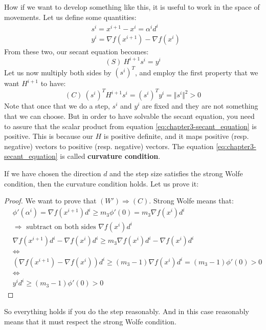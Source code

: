 How if we want to develop something like this, it is useful to work in the space of movements. Let us define some quantities:
\begin{align}
    &s^i = x^{i+1} - x^i = \alpha^i d^i\\
    &y^i = \nabla f(x^{i+1}) - \nabla f(x^i)
\end{align}
From these two, our secant equation becomes:
\begin{equation}
    (S)\ H^{i+1} s^i = y^i
\end{equation}
Let us now multiply both sides by $(s^i)^T$, and employ the first property that we want $H^{i+1}$ to have:
\begin{equation}
    (C)\ (s^i)^T H^{i+1} s^i = (s^i)^T y^i = \Vert s^i \Vert^2 > 0
    \label{eq:chapter3-secant_equation}
\end{equation}
Note that once that we do a step, $s^i$ and $y^i$ are fixed and they are not something that we can choose. But in order to have solvable the secant equation, you need to assure that the scalar product from equation \ref{eq:chapter3-secant_equation} is positive. This is because our $H$ is positive definite, and it maps positive (resp. negative) vectors to positive (resp. negative) vectors. The equation \ref{eq:chapter3-secant_equation} is called \textbf{curvature condition}.
\par If we have chosen the direction $d$ and the step size satisfies the strong Wolfe condition, then the curvature condition holds. Let us prove it:
\begin{proof}
    We want to prove that $(W') \Rightarrow (C)$. Strong Wolfe means that:
    \begin{align}
        &\phi'(\alpha^i) = \nabla f(x^{i+1}) d^i \geq m_3 \phi'(0) = m_3 \nabla f(x^i) d^i\\
        &\Rightarrow \mbox{ subtract on both sides $\nabla f(x^i) d^i$}\\
        &\nabla f(x^{i+1}) d^i - \nabla f(x^i) d^i \geq m_3 \nabla f(x^i) d^i - \nabla f(x^i) d^i\\
        &\iff\\
        &(\nabla f(x^{i+1}) - \nabla f(x^i)) d^i \geq (m_3 - 1) \nabla f(x^i) d^i = (m_3 - 1)\phi'(0) > 0\\
        &\iff\\
        &y^i d^i \geq (m_3 - 1) \phi'(0) > 0
    \end{align}
\end{proof}
So everything holds if you do the step reasonably. And in this case reasonably means that it must respect the strong Wolfe condition.
